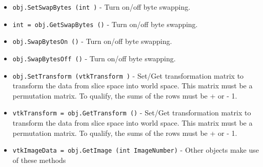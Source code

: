 \begin{itemize}
\item  \verb|obj.SetSwapBytes (int )| -  Turn on/off byte swapping.

\item  \verb|int = obj.GetSwapBytes ()| -  Turn on/off byte swapping.

\item  \verb|obj.SwapBytesOn ()| -  Turn on/off byte swapping.

\item  \verb|obj.SwapBytesOff ()| -  Turn on/off byte swapping.

\item  \verb|obj.SetTransform (vtkTransform )| -  Set/Get transformation matrix to transform the data from slice space
 into world space. This matrix must be a permutation matrix. To qualify,
 the sums of the rows must be + or - 1.

\item  \verb|vtkTransform = obj.GetTransform ()| -  Set/Get transformation matrix to transform the data from slice space
 into world space. This matrix must be a permutation matrix. To qualify,
 the sums of the rows must be + or - 1.

\item  \verb|vtkImageData = obj.GetImage (int ImageNumber)| -  Other objects make use of these methods

\end{itemize}
